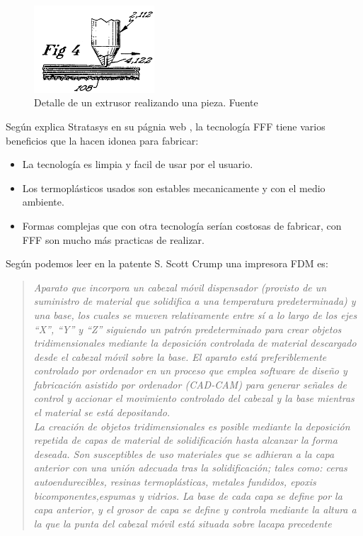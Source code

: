     \begin{figure}[H]
            \centering
            \includegraphics[width=0.4\textwidth]{images/capas_fdm.png}
            \caption{Detalle  de un extrusor realizando una pieza. Fuente  \cite{crump1992apparatus}}
            \label{fig:detalle_capas}
    \end{figure}
Según explica Stratasys en su págnia web \cite{FDMTechnology}, la tecnología FFF tiene varios beneficios que la hacen idonea para fabricar:
\begin{itemize}
    \item La tecnología es limpia y facil de usar por el usuario.
    \item Los termoplásticos usados son estables mecanicamente y con el medio ambiente.
    \item Formas complejas que con otra tecnología serían costosas de fabricar, con FFF son mucho más practicas de realizar.
\end{itemize}

Según podemos leer en la patente S. Scott Crump \cite{crump1992apparatus} una impresora FDM es:

\begin{quotation}
\emph{
Aparato que incorpora un cabezal móvil dispensador (provisto de un suministro de material que solidifica a una temperatura predeterminada) y una base, los cuales se mueven relativamente entre sí a lo largo de los ejes “X”, “Y” y “Z” siguiendo un patrón predeterminado para crear objetos tridimensionales mediante la deposición controlada de material descargado desde el cabezal móvil sobre la base. El aparato está preferiblemente controlado por ordenador en un proceso que emplea software de diseño y fabricación asistido por ordenador (CAD-CAM) para generar señales de control y accionar el movimiento controlado del cabezal y la base mientras el material se está depositando.}\\

\emph{La creación de objetos tridimensionales es posible mediante la deposición repetida de  capas de material de solidificación hasta alcanzar la forma deseada. Son susceptibles de uso materiales que se adhieran a la capa anterior con una unión adecuada tras la solidificación; tales como: ceras autoendurecibles, resinas termoplásticas, metales fundidos, epoxis bicomponentes,espumas y vidrios. La base de cada capa se define por la capa anterior, y el grosor de capa se define y controla mediante la altura a la que la punta del cabezal móvil está situada sobre lacapa precedente}

\end{quotation}

